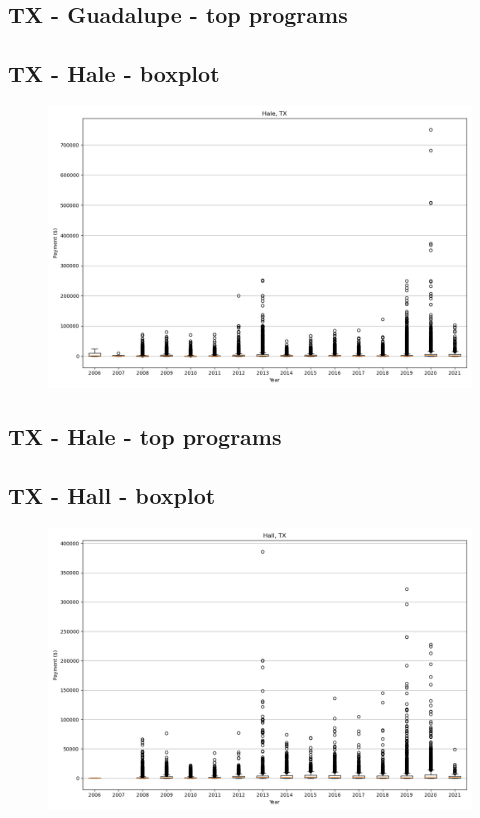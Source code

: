 \subsection*{TX - Guadalupe - top programs}

\newpage
\subsection*{TX - Hale - boxplot}
\begin{figure}[h]
\centering
\includegraphics[width=7in]{../output/boxplots/counties/Hale-TX_boxplot.png}
\end{figure}


\subsection*{TX - Hale - top programs}

\newpage
\subsection*{TX - Hall - boxplot}
\begin{figure}[h]
\centering
\includegraphics[width=7in]{../output/boxplots/counties/Hall-TX_boxplot.png}
\end{figure}


